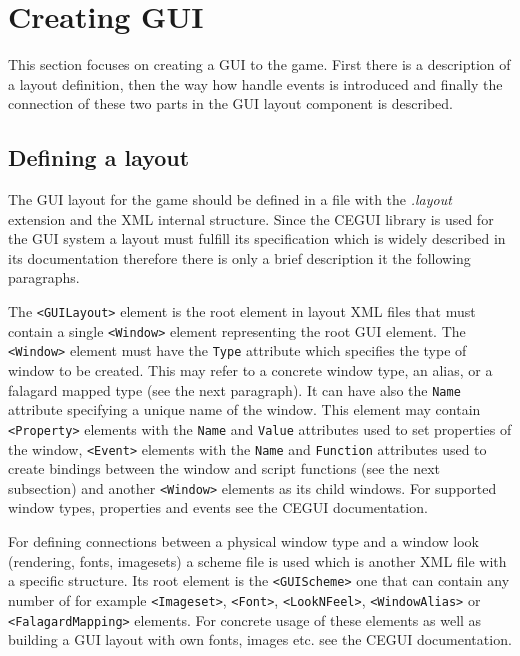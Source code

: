 \section{Creating GUI}
\label{sec:gui-creating}

This section focuses on creating a GUI to the game. First there is a description of a layout definition, then the way how handle events is introduced and finally the connection of these two parts in the GUI layout component is described.

\subsection{Defining a layout}

The GUI layout for the game should be defined in a file with the \emph{.layout} extension and the XML internal structure. Since the CEGUI library is used for the GUI system a layout must fulfill its specification which is widely described in its documentation \cite{cegui-doc} therefore there is only a brief description it the following paragraphs.

The \verb/<GUILayout>/ element is the root element in layout XML files that must contain a single \verb/<Window>/ element representing the root GUI element. The \verb/<Window>/ element must have the \verb/Type/ attribute which specifies the type of window to be created. This may refer to a concrete window type, an alias, or a falagard mapped type (see the next paragraph). It can have also the \verb/Name/ attribute specifying a unique name of the window. This element may contain \verb/<Property>/ elements with the \verb/Name/ and \verb/Value/ attributes used to set properties of the window, \verb/<Event>/ elements with the \verb/Name/ and \verb/Function/ attributes used to create bindings between the window and script functions (see the next subsection) and another \verb/<Window>/ elements as its child windows. For supported window types, properties and events see the CEGUI documentation.

For defining connections between a physical window type and a window look (rendering, fonts, imagesets) a scheme file is used which is another XML file with a specific structure. Its root element is the \verb/<GUIScheme>/ one that can contain any number of for example \verb/<Imageset>/, \verb/<Font>/, \verb/<LookNFeel>/, \verb/<WindowAlias>/ or \verb/<FalagardMapping>/ elements. For concrete usage of these elements as well as building a GUI layout with own fonts, images etc. see the CEGUI documentation.


